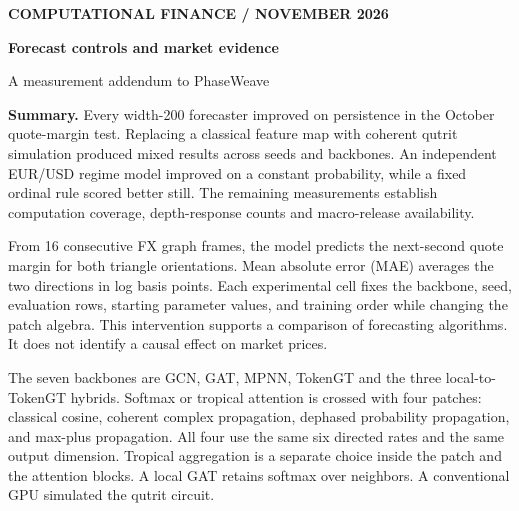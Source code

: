 \documentclass[11pt,letterpaper]{article}
\newcommand{\slug}[1]{{\small\sffamily\bfseries\color{viridian}#1}\par}
\newcommand{\heading}[1]{\vspace{.34em}{\Large\bfseries #1}\par}
\begin{document}
\slug{COMPUTATIONAL FINANCE \enspace /  NOVEMBER 2026}
{\fontsize{27}{30}\selectfont\bfseries Forecast controls and market evidence}\par
{\large A measurement addendum to PhaseWeave}\par
\smallskip
\textbf{Summary.} Every width-200 forecaster improved on persistence in the October quote-margin test. Replacing a classical feature map with coherent qutrit simulation produced mixed results across seeds and backbones. An independent EUR/USD regime model improved on a constant probability, while a fixed ordinal rule scored better still. The remaining measurements establish computation coverage, depth-response counts and macro-release availability.

\heading{1. Matched interventions on the forecaster}
From 16 consecutive FX graph frames, the model predicts the next-second quote margin for both triangle orientations. Mean absolute error (MAE) averages the two directions in log basis points. Each experimental cell fixes the backbone, seed, evaluation rows, starting parameter values, and training order while changing the patch algebra. This intervention supports a comparison of forecasting algorithms. It does not identify a causal effect on market prices.

The seven backbones are GCN, GAT, MPNN, TokenGT and the three local-to-TokenGT hybrids. Softmax or tropical attention is crossed with four patches: classical cosine, coherent complex propagation, dephased probability propagation, and max-plus propagation. All four use the same six directed rates and the same output dimension. Tropical aggregation is a separate choice inside the patch and the attention blocks. A local GAT retains softmax over neighbors. A conventional GPU simulated the qutrit circuit.
\end{document}
